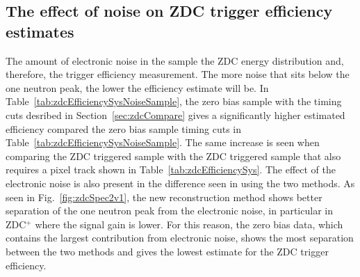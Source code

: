     \subsection{The effect of noise on ZDC trigger efficiency estimates}
      The amount of electronic noise in the sample \DIFdelbegin {}\DIFdelend \DIFaddbegin {}\DIFaddend the ZDC energy 
        distribution and, therefore, the trigger efficiency measurement.
      The more noise that sits below the one neutron peak, the lower the 
        efficiency estimate will be. 
      In Table~\ref{tab:zdcEfficiencySysNoiseSample}, the zero bias sample 
        with the timing cuts desribed in Section~\ref{sec:zdcCompare} gives a 
        significantly higher
        estimated efficiency compared the zero bias sample \DIFdelbegin {}\DIFdelend \DIFaddbegin {}\DIFaddend timing cuts
        in Table~\ref{tab:zdcEfficiencySysNoiseSample}.
      The same increase is seen when comparing the ZDC triggered sample with 
        the ZDC triggered sample that also requires a pixel track shown in
        Table~\ref{tab:zdcEfficiencySys}. 
      The effect of the electronic noise is also present in the difference seen
        in using the two methods.
      As seen in Fig.~\ref{fig:zdcSpec2v1}, the new reconstruction method 
        shows better separation of the one neutron peak from the electronic 
        noise, in particular in ZDC$^{+}$ where the signal gain is lower.
      For this reason, the zero bias data, which contains the largest 
        contribution from electronic noise, shows the most separation between 
        the two methods and gives the lowest estimate for the ZDC trigger 
        efficiency.
